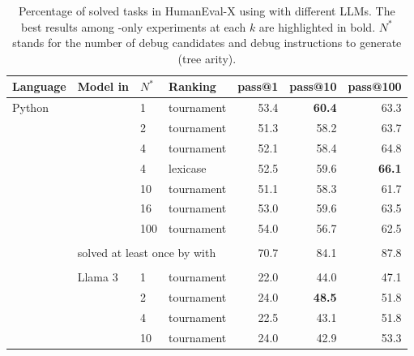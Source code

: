 \begin{table}[t]
    \centering
    \caption{Percentage of solved tasks in HumanEval-X using \method{} with different LLMs. The best results among \method{}-only experiments at each $k$ are highlighted in bold. $N^*$ stands for the number of debug candidates and debug instructions to generate (tree arity).}\small
    \label{tab:generalizability-he}
\begin{adjustbox}{max width=\textwidth}
\begin{DIFnomarkup} %
\begin{tabular}{llllrrr}
\toprule
Language & Model in \method{} & $N^*$ & Ranking &  pass@1 &  pass@10 &  pass@100 \\
\midrule
Python & \gpt{} & 1   &         tournament &    53.4 &     \textbf{60.4} &      63.3 \\
       &        & 2   &         tournament &    51.3 &     58.2 &      63.7 \\
       &        & 4   &         tournament &    52.1 &     58.4 &      64.8 \\
       &        & 4   &           lexicase &    52.5 &     59.6 &      \textbf{66.1} \\
       &        & 10  &         tournament &    51.1 &     58.3 &      61.7 \\
       &        & 16  &         tournament &    53.0 &     59.6 &      63.5 \\
       &        & 100 &         tournament &    54.0 &     56.7 &      62.5 \\[1pt]
\cline{3-7}\\[-8pt]
       & \multicolumn{3}{l}{solved at least once by \method{} with \gpt{}}   & 70.7 &     84.1 &      87.8 \\[1pt]
\cline{2-7}\\[-8pt]
    &   Llama 3 & 1   &         tournament &    22.0 &     44.0 &      47.1 \\
       &        & 2   &         tournament &    24.0 &     \textbf{48.5 }&      51.8 \\
       &        & 4   &         tournament &    22.5 &     43.1 &      51.8 \\
       &        & 10  &         tournament &    24.0 &     42.9 &      53.3 \\

\end{tabular}
\end{DIFnomarkup}
\end{adjustbox}
\end{table}
